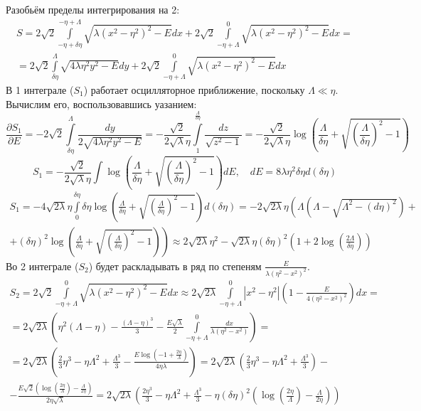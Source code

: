 \documentclass[12pt]{article}
\theoremstyle{definition}
\begin{document}
Разобьём пределы интегрирования на 2:
\begin{multline}
    S=2\sqrt{2}\int\limits_{-\eta+\delta\eta}^{-\eta+\Lambda}\sqrt{\lambda(x^2-\eta^2)^2-E}dx+2\sqrt{2}\int\limits_{-\eta+\Lambda}^0\sqrt{\lambda(x^2-\eta^2)^2-E}dx=\\=2\sqrt{2}\int\limits_{\delta\eta}^{\Lambda}\sqrt{4\lambda\eta^2y^2-E}dy+2\sqrt{2}\int\limits_{-\eta+\Lambda}^0\sqrt{\lambda(x^2-\eta^2)^2-E}dx
\end{multline}
В 1 интеграле ($S_1$) работает осцилляторное приближение, поскольку $\Lambda\ll\eta$. Вычислим его, воспользовавшись уазанием:
\begin{equation*}
    \frac{\partial S_1}{\partial E}=-2\sqrt{2}\int\limits_{\delta\eta}^{\Lambda}\frac{dy}{2\sqrt{4\lambda\eta^2y^2-E}}=-\frac{\sqrt{2}}{2\sqrt{\lambda}\eta}\int\limits_1^{\frac{\Lambda}{\delta\eta}}\frac{dz}{\sqrt{z^2-1}}=-\frac{\sqrt{2}}{2\sqrt{\lambda}\eta}\log\left(\frac{\Lambda}{\delta\eta}+\sqrt{\left(\frac{\Lambda}{\delta\eta}\right)^2-1}\right)
\end{equation*}
\begin{equation}
    S_1=-\frac{\sqrt{2}}{2\sqrt{\lambda}\eta}\int\log\left(\frac{\Lambda}{\delta\eta}+\sqrt{\left(\frac{\Lambda}{\delta\eta}\right)^2-1}\right)dE,\quad dE=8\lambda\eta^2\delta\eta d(\delta\eta)
\end{equation}
\begin{multline}
    S_1=-4\sqrt{2\lambda}\eta\int\limits_0^{\delta\eta}\delta\eta\log\left(\frac{\Lambda}{\delta\eta}+\sqrt{\left(\frac{\Lambda}{\delta\eta}\right)^2-1}\right)d(\delta\eta)=-2\sqrt{2\lambda}\eta\left(\Lambda(\Lambda-\sqrt{\Lambda^2-(d\eta)^2})+\right.\\\left.+(\delta\eta)^2\log\left(\frac{\Lambda}{\delta\eta}+\sqrt{\left(\frac{\Lambda}{\delta\eta}\right)^2-1}\right)\right)\approx2\sqrt{2\lambda}\eta^2-\sqrt{2\lambda}\eta(\delta\eta)^2\left(1+2\log\left(\frac{2\Lambda}{\delta\eta}\right)\right)
\end{multline}
Во 2 интеграле ($S_2$) будет раскладывать в ряд по степеням $\frac{E}{\lambda(\eta^2-x^2)^2}$.
\begin{multline*}
    S_2=2\sqrt{2}\int\limits_{-\eta+\Lambda}^0\sqrt{\lambda(x^2-\eta^2)^2-E}dx\approx2\sqrt{2\lambda}\int\limits_{-\eta+\Lambda}^0|x^2-\eta^2|\left(1-\frac{E}{4(\eta^2-x^2)^2}\right)dx=\\=2\sqrt{2\lambda}\left(\eta^2(\Lambda-\eta)-\frac{(\Lambda-\eta)^3}{3}-\frac{E\sqrt{\lambda}}{2}\int\limits_{-\eta+\Lambda}^0\frac{dx}{\lambda(\eta^2-x^2)}\right)=\\=2\sqrt{2\lambda}\left(\frac{2}{3}\eta^3-\eta\Lambda^2+\frac{\Lambda^3}{3}-\frac{E\log\left(-1+\frac{2\eta}{\Lambda}\right)}{4\eta\lambda}\right)=2\sqrt{2\lambda}\left(\frac{2}{3}\eta^3-\eta\Lambda^2+\frac{\Lambda^3}{3}\right)-\\-\frac{E\sqrt{2}\left(\log\left(\frac{2\eta}{\Lambda}\right)-\frac{\Lambda}{2\eta}\right)}{2\eta\sqrt{\lambda}}=2\sqrt{2\lambda}\left(\frac{2\eta^3}{3}-\eta\Lambda^2+\frac{\Lambda^3}{3}-\eta(\delta\eta)^2\left(\log\left(\frac{2\eta}{\Lambda}\right)-\frac{\Lambda}{2\eta}\right)\right)
\end{multline*}
\end{document}
